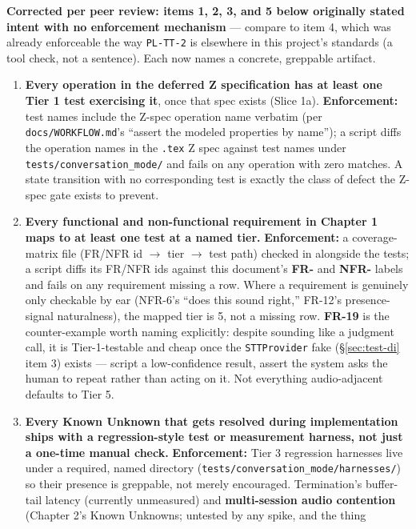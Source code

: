 \documentclass[a4paper,11pt]{report}
\newcommand{\fr}[1]{\textbf{FR-#1}}
\newcommand{\nfr}[1]{\textbf{NFR-#1}}
\begin{document}
\textbf{Corrected per peer review: items 1, 2, 3, and 5 below originally
stated intent with no enforcement mechanism} --- compare to item 4, which
was already enforceable the way \texttt{PL-TT-2} is elsewhere in this
project's standards (a tool check, not a sentence). Each now names a
concrete, greppable artifact.

\begin{enumerate}
  \item \textbf{Every operation in the deferred Z specification has at
    least one Tier 1 test exercising it}, once that spec exists (Slice
    1a). \textbf{Enforcement:} test names include the Z-spec operation
    name verbatim (per \texttt{docs/WORKFLOW.md}'s ``assert the modeled
    properties by name''); a script diffs the operation names in the
    \texttt{.tex} Z spec against test names under
    \texttt{tests/conversation\_mode/} and fails on any operation with
    zero matches. A state transition with no corresponding test is
    exactly the class of defect the Z-spec gate exists to prevent.
  \item \textbf{Every functional and non-functional requirement in
    Chapter 1 maps to at least one test at a named tier.}
    \textbf{Enforcement:} a coverage-matrix file (FR/NFR id $\to$ tier
    $\to$ test path) checked in alongside the tests; a script diffs its
    FR/NFR ids against this document's \fr{} and \nfr{} labels and fails
    on any requirement missing a row. Where a requirement is genuinely
    only checkable by ear (NFR-6's ``does this sound right,'' FR-12's
    presence-signal naturalness), the mapped tier is 5, not a missing
    row. \fr{19} is the counter-example worth naming explicitly: despite
    sounding like a judgment call, it is Tier-1-testable and cheap once
    the \texttt{STTProvider} fake (\S\ref{sec:test-di} item 3) exists ---
    script a low-confidence result, assert the system asks the human to
    repeat rather than acting on it. Not everything audio-adjacent
    defaults to Tier 5.
  \item \textbf{Every Known Unknown that gets resolved during
    implementation ships with a regression-style test or measurement
    harness, not just a one-time manual check.} \textbf{Enforcement:}
    Tier 3 regression harnesses live under a required, named directory
    (\texttt{tests/conversation\_mode/harnesses/}) so their presence is
    greppable, not merely encouraged. Termination's buffer-tail latency
    (currently unmeasured) and \textbf{multi-session audio contention}
    (Chapter 2's Known Unknowns; untested by any spike, and the thing

\end{enumerate}
\end{document}
